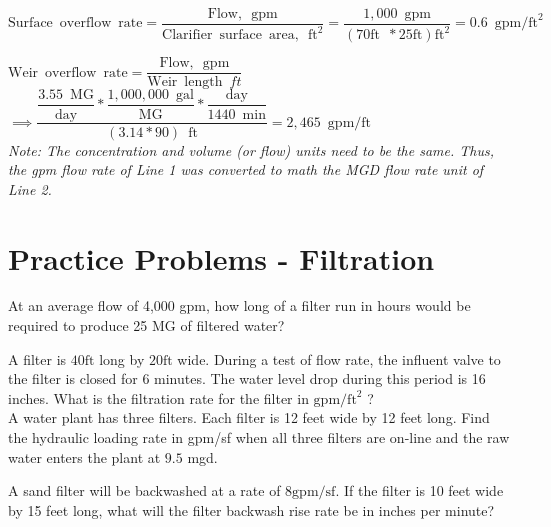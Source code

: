 \vspace{0.2cm}
$\mathrm{Surface \enspace overflow \enspace rate}=\dfrac{\mathrm{Flow, \enspace gpm}}{\mathrm{Clarifier \enspace surface \enspace area, \enspace ft}^2}=\dfrac{1,000 \enspace \mathrm{gpm}}{(70 \mathrm{ft} \enspace * 25 \mathrm{ft})\mathrm{ft}^2}=\boxed{0.6 \enspace \mathrm{gpm/ft}^2}$

\vspace{0.2cm}
$\mathrm{Weir \enspace overflow \enspace rate}=\dfrac{\mathrm{Flow, \enspace gpm}}{\mathrm{Weir} \enspace \mathrm{length} \enspace ft}$\\
\vspace{0.3cm}
$\implies \dfrac{ \dfrac{3.55 \enspace \mathrm{MG}}{\mathrm{day}}*\dfrac{1,000,000 \enspace \mathrm{gal}}{\mathrm{MG}}*\dfrac{\mathrm{day}}{1440 \enspace \mathrm{min}}}{ (3.14*90) \enspace \mathrm{ft}}=\boxed{2,465 \enspace  \mathrm{gpm/ft}}$\\
\vspace{0.3cm}
\textit{Note: The concentration and volume (or flow) units need to be the same.  Thus, the gpm flow rate of Line 1 was converted to math the MGD flow rate unit of Line 2.}







\section*{Practice Problems - Filtration}

	At an average flow of 4,000 gpm, how long of a filter run in hours would be required to produce 25 MG of filtered water?
	
	A filter is $40 \mathrm{ft}$ long by $20 \mathrm{ft}$ wide. During a test of flow rate, the influent valve to the filter is closed for 6 minutes. The water level drop during this period is 16 inches. What is the filtration rate for the filter in $\mathrm{gpm} / \mathrm{ft}^{2}$ ?\\

  A water plant has three filters. Each filter is 12 feet wide by 12 feet long. Find the hydraulic loading rate in gpm/sf when all three filters are on-line and the raw water enters the plant at $9.5$ mgd.

  A sand filter will be backwashed at a rate of $8 \mathrm{gpm} / \mathrm{sf}$. If the filter is 10 feet wide by 15 feet long, what will the filter backwash rise rate be in inches per minute?

